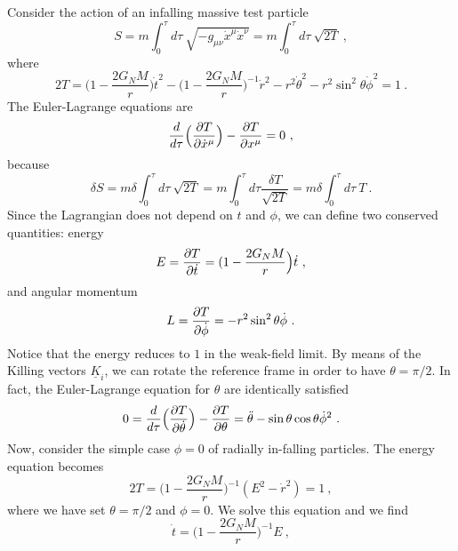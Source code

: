     Consider the action of an infalling massive test particle
    \begin{equation*}
        S = m \int_0^\tau d\tau ~ \sqrt{-g_{\mu\nu} \dot x^\mu \dot x^\nu} = m \int_0^\tau d\tau ~ \sqrt{2T} ~,
    \end{equation*}
    where 
    \begin{equation*}
        2 T = (1 - \frac{2 G_N M}{r} \Big ) \dot t^2 - (1 - \frac{2 G_N M}{r} \Big )^{-1} \dot r^2 - r^2 \dot \theta^2 - r^2 \sin^2 \theta \dot \phi^2 = 1 ~.
    \end{equation*}
    The Euler-Lagrange equations are 
    \begin{equation*}
        \frac{d}{d\tau} \Big ( \frac{\partial T}{\partial\dot x^\mu} \Big) - \frac{\partial T}{\partial x^\mu} = 0~,
    \end{equation*}
    because
    \begin{equation*}
        \delta S = m \delta \int_0^\tau d\tau ~ \sqrt{2T} = m \int_0^\tau d\tau \frac{\delta T}{\sqrt{2T}} = m \delta \int_0^\tau d\tau ~ T ~.
    \end{equation*}
    Since the Lagrangian does not depend on $t$ and $\phi$, we can define two conserved quantities: energy 
    \begin{equation*}
        E = \frac{\partial T}{\partial\dot t} = (1 - \frac{2 G_N M}{r} \Big ) \dot t ~,
    \end{equation*}
    and angular momentum 
    \begin{equation*}
        L = \frac{\partial T}{\partial\dot \phi} = - r^2 \sin^2 \theta \dot \phi ~.
    \end{equation*}
    Notice that the energy reduces to $1$ in the weak-field limit. By means of the Killing vectors $\underline K_i$, we can rotate the reference frame in order to have $\theta = \pi/2$. In fact, the Euler-Lagrange equation for $\theta$ are identically satisfied
    \begin{equation*}
        0 = \frac{d}{d\tau} \Big ( \frac{\partial T}{\partial\dot \theta} \Big) - \frac{\partial T}{\partial\theta} = \ddot \theta - \sin \theta \cos \theta \dot \phi^2 ~.
    \end{equation*}
    Now, consider the simple case $\phi = 0$ of radially in-falling particles. The energy equation becomes
    \begin{equation*}
        2T = (1 - \frac{2 G_N M}{r} \Big )^{-1} (E^2 - \dot r^2) = 1 ~,
    \end{equation*}
    where we have set $\theta = \pi/2$ and $\phi = 0$. We solve this equation and we find 
    \begin{equation*}
        \dot t = (1 - \frac{2 G_N M}{r} \Big )^{-1} E ~,
    \end{equation*}
